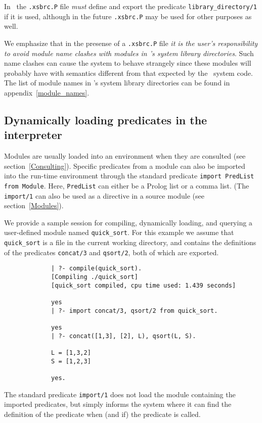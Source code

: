 In \version\ the {\verb|.xsbrc.P|} file {\em must} define and 
export the predicate {\tt library\_directory/1} if it is used, although
in the future {\verb|.xsbrc.P|} may be used for other purposes as well.

We emphasize that in the presense of a {\verb|.xsbrc.P|} file
{\em it is the user's responsibility to avoid module name clashes 
with modules in \ourprolog's system library directories}.
Such name clashes can cause the system to behave strangely since these
modules will probably have with semantics different from that expected
by the \ourprolog\ system code.  The list of module names in
\ourprolog's system library directories can be found in
appendix~\ref{module_names}.


\subsection{Dynamically loading predicates in the interpreter}
Modules are usually loaded into an environment when they are consulted
(see section~\ref{Consulting}).  Specific predicates from a module can
also be imported into the run-time environment through the standard 
predicate {\tt import PredList from Module}.
Here, {\tt PredList} can either be a Prolog list or a comma list.  (The
{\tt import/1} can also be used as a directive in a source module 
(see section~\ref{Modules}).

We provide a sample session for compiling, dynamically loading, and 
querying a user-defined module named {\tt quick\_sort}.
For this example we assume that {\tt quick\_sort} is a file in the 
current working directory, and contains the definitions of the
predicates {\tt concat/3} and {\tt qsort/2}, both of which are exported.

{\footnotesize
\begin{verbatim}
             | ?- compile(quick_sort).
             [Compiling ./quick_sort]
             [quick_sort compiled, cpu time used: 1.439 seconds]

             yes
             | ?- import concat/3, qsort/2 from quick_sort. 

             yes
             | ?- concat([1,3], [2], L), qsort(L, S).

             L = [1,3,2]
             S = [1,2,3]

             yes.
\end{verbatim}
}

The standard predicate {\tt import/1} does not load the module 
containing the imported predicates, but simply informs the system 
where it can find the definition of the predicate when (and if) the
predicate is called.
